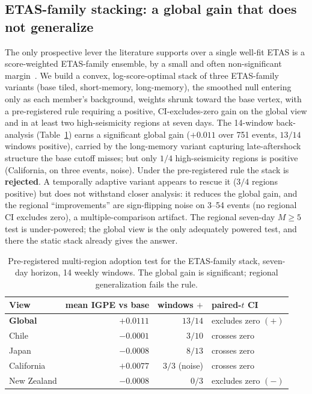 \documentclass[journal]{IEEEtran}
\begin{document}
\subsection{ETAS-family stacking: a global gain that does not generalize}
\label{sec:stack}

The only prospective lever the literature supports over a single well-fit ETAS is a
score-weighted ETAS-family ensemble, by a small and often non-significant
margin~\cite{marzocchi2012,herrmann2023}. We build a convex, log-score-optimal stack of
three ETAS-family variants (base tiled, short-memory, long-memory), the smoothed null
entering only as each member's background, weights shrunk toward the base vertex, with a
pre-registered rule requiring a positive, CI-excludes-zero gain on the global view and in at
least two high-seismicity regions at seven days. The 14-window back-analysis
(Table~\ref{tab:stack}) earns a significant global gain ($+0.011$ over 751 events,
$13/14$ windows positive), carried by the long-memory variant capturing late-aftershock
structure the base cutoff misses; but only $1/4$ high-seismicity regions is positive
(California, on three events, noise). Under the pre-registered rule the stack is
\textbf{rejected}. A temporally adaptive variant appears to rescue it ($3/4$ regions positive)
but does not withstand closer analysis: it reduces the global gain, and the regional
``improvements'' are sign-flipping noise on 3--54 events (no regional CI excludes zero), a
multiple-comparison artifact. The regional seven-day $M\!\ge\!5$ test is under-powered; the
global view is the only adequately powered test, and there the static stack already gives
the answer.

\begin{table}[!t]
\caption{Pre-registered multi-region adoption test for the ETAS-family stack, seven-day
horizon, 14 weekly windows. The global gain is significant; regional generalization fails
the rule.}
\label{tab:stack}
\centering
\begin{tabular}{lrrl}
\toprule
View & mean IGPE vs base & windows $+$ & paired-$t$ CI \\
\midrule
\textbf{Global} & $\mathbf{+0.0111}$ & $13/14$ & excludes zero $(+)$ \\
Chile & $-0.0001$ & $3/10$ & crosses zero \\
Japan & $-0.0008$ & $8/13$ & crosses zero \\
California & $+0.0077$ & $3/3$ (noise) & crosses zero \\
New Zealand & $-0.0008$ & $0/3$ & excludes zero $(-)$ \\
\bottomrule
\end{tabular}
\end{table}
\end{document}
